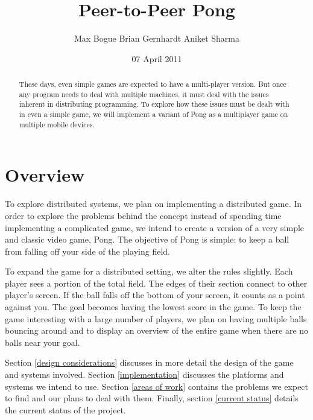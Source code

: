 \documentclass{sig-alternate}
\begin{document}
\title{Peer-to-Peer Pong}
\author{
\alignauthor
Max Bogue
\alignauthor
Brian Gernhardt
\alignauthor
Aniket Sharma
}
\date{07 April 2011}
\maketitle

\begin{abstract}
	These days, even simple games are expected to have a multi-player
	version.  But once any program needs to deal with multiple machines,
	it must deal with the issues inherent in distributing programming.  To
	explore how these issues must be dealt with in even a simple game, we
	will implement a variant of Pong as a multiplayer game on multiple
	mobile devices.
\end{abstract}

\section{Overview}
\label{overview}


To explore distributed systems, we plan on implementing a distributed game.
In order to explore the problems behind the concept instead of spending
time implementing a complicated game, we intend to create a version of a
very simple and classic video game, Pong.  The objective of Pong is simple:
to keep a ball from falling off your side of the playing field.

To expand the game for a distributed setting, we alter the rules slightly.
Each player sees a portion of the total field.  The edges of their section
connect to other player's screen.  If the ball falls off the bottom of your
screen, it counts as a point against you.  The goal becomes having the
lowest score in the game.  To keep the game interesting with a large number
of players, we plan on having multiple balls bouncing around and to display
an overview of the entire game when there are no balls near your goal.

Section \ref{design considerations} discusses in more detail the design of
the game and systems involved.  Section \ref{implementation} discusses the
platforms and systems we intend to use.  Section \ref{areas of work}
contains the problems we expect to find and our plans to deal with them.
Finally, section \ref{current status} details the current status of the
project.
\end{document}
